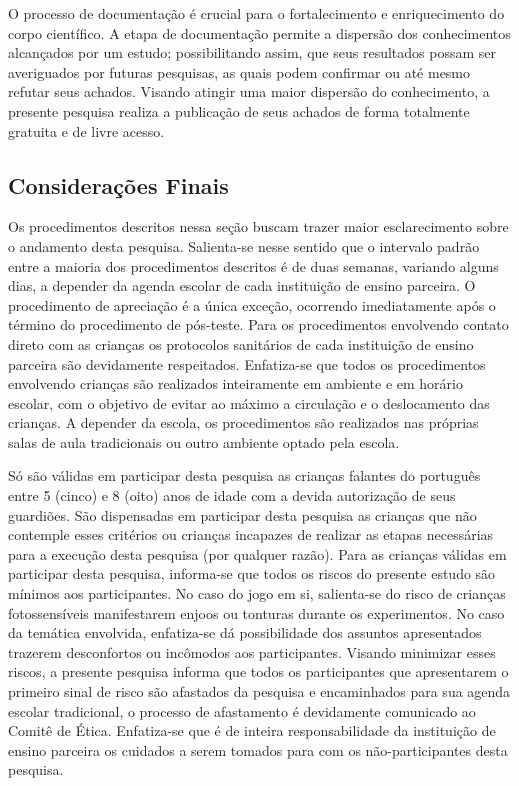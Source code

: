 O processo de documentação é crucial para o fortalecimento e enriquecimento do corpo científico. A etapa de documentação permite a dispersão dos conhecimentos alcançados por um estudo; possibilitando assim, que seus resultados possam ser averiguados por futuras pesquisas, as quais podem confirmar ou até mesmo refutar seus achados. Visando atingir uma maior dispersão do conhecimento, a presente pesquisa realiza a publicação de seus achados de forma totalmente gratuita e de livre acesso.


\subsection{Considerações Finais}\label{subsec:CF}

Os procedimentos descritos nessa seção buscam trazer maior esclarecimento sobre o andamento desta pesquisa. Salienta-se nesse sentido que o intervalo padrão entre a maioria dos procedimentos descritos é de duas semanas, variando alguns dias, a depender da agenda escolar de cada instituição de ensino parceira. O procedimento de apreciação é a única exceção, ocorrendo imediatamente após o término do procedimento de pós-teste. Para os procedimentos envolvendo contato direto com as crianças os protocolos sanitários de cada instituição de ensino parceira são devidamente respeitados. Enfatiza-se que todos os procedimentos envolvendo crianças são realizados inteiramente em ambiente e em horário escolar, com o objetivo de evitar ao máximo a circulação e o deslocamento das crianças. A depender da escola, os procedimentos são realizados nas próprias salas de aula tradicionais ou outro ambiente optado pela escola. 

Só são válidas em participar desta pesquisa as crianças falantes do português entre 5 (cinco) e 8 (oito) anos de idade com a devida autorização de seus guardiões. São dispensadas em participar desta pesquisa as crianças que não contemple esses critérios ou crianças incapazes de realizar as etapas necessárias para a execução desta pesquisa (por qualquer razão). Para as crianças válidas em participar desta pesquisa, informa-se que todos os riscos do presente estudo são mínimos aos participantes. No caso do jogo em si, salienta-se do risco de crianças fotossensíveis manifestarem enjoos ou tonturas durante os experimentos. No caso da temática envolvida, enfatiza-se dá possibilidade dos assuntos apresentados trazerem desconfortos ou incômodos aos participantes. Visando minimizar esses riscos, a presente pesquisa informa que todos os participantes que apresentarem o primeiro sinal de risco são afastados da pesquisa e encaminhados para sua agenda escolar tradicional, o processo de afastamento é devidamente comunicado ao Comitê de Ética. %
Enfatiza-se que é de inteira responsabilidade da instituição de ensino parceira os cuidados a serem tomados para com os não-participantes desta pesquisa. 

